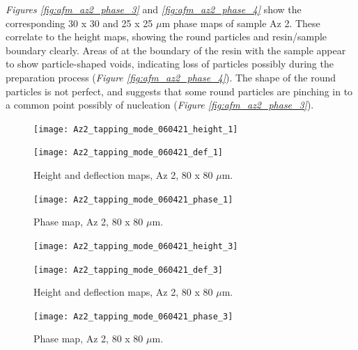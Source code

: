 \textit{Figures \ref{fig:afm_az2_phase_3}} and \textit{\ref{fig:afm_az2_phase_4}} show the corresponding 30 x 30 and 25 x 25 $\mu$m phase maps of sample Az 2. These correlate to the height maps, showing the round particles and resin/sample boundary clearly. Areas of at the boundary of the resin with the sample appear to show particle-shaped voids, indicating loss of particles possibly during the preparation process (\textit{Figure \ref{fig:afm_az2_phase_4}}). The shape of the round particles is not perfect, and suggests that some round particles are pinching in to a common point possibly of nucleation (\textit{Figure \ref{fig:afm_az2_phase_3}}). 


\begin{figure}[H]
\centering
\begin{minipage}{.45\textwidth}
  \centering
  \texttt{[image: Az2\_tapping\_mode\_060421\_height\_1]}
\end{minipage}
\begin{minipage}{.45\textwidth}
  \centering
  \texttt{[image: Az2\_tapping\_mode\_060421\_def\_1]}
\end{minipage}
\caption[Height and deflection maps, Az 2]{Height and deflection maps, Az 2, 80 x 80 $\mu$m.}
\label{fig:afm_az2_height_def_1}
\end{figure}

\begin{figure}[H]
\centering
  \texttt{[image: Az2\_tapping\_mode\_060421\_phase\_1]}
\caption[Phase map, Az 2]{Phase map, Az 2, 80 x 80 $\mu$m.}
\label{fig:afm_az2_phase_1}
\end{figure}


\begin{figure}[H]
\centering
\begin{minipage}{.45\textwidth}
  \centering
  \texttt{[image: Az2\_tapping\_mode\_060421\_height\_3]}
\end{minipage}
\begin{minipage}{.45\textwidth}
  \centering
  \texttt{[image: Az2\_tapping\_mode\_060421\_def\_3]}
\end{minipage}
\caption[Height and deflection maps, Az 2]{Height and deflection maps, Az 2, 80 x 80 $\mu$m.}
\label{fig:afm_az2_height_def_2}
\end{figure}

\begin{figure}[H]
\centering
  \texttt{[image: Az2\_tapping\_mode\_060421\_phase\_3]}
\caption[Phase map, Az 2]{Phase map, Az 2, 80 x 80 $\mu$m.}
\label{fig:afm_az2_phase_2}
\end{figure}


